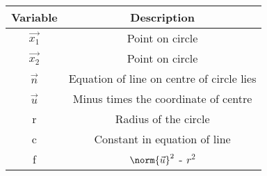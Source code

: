\begin{tabular}[12pt]{ |c| c|}
    \hline
    \textbf{Variable} & \textbf{Description} \\ 
    \hline
    $\vec{x_1}$ & Point on circle \\
    \hline
    $\vec{x_2}$ & Point on circle \\
    \hline 
    $\vec{n}$ &  Equation of line on centre of circle lies \\
    \hline
    $\vec{u}$ & Minus times the coordinate of centre\\
    \hline
    r & Radius of the circle\\
    \hline
    c & Constant in equation of line\\
    \hline
    f & $\norm{\vec{u}}^2$ - $r^2$ \\ 
    \hline   
    \end{tabular}
